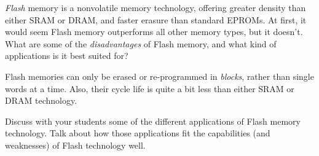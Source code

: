 

{\it Flash} memory is a nonvolatile memory technology, offering greater density than either SRAM or DRAM, and faster erasure than standard EPROMs.  At first, it would seem Flash memory outperforms all other memory types, but it doesn't.  What are some of the {\it disadvantages} of Flash memory, and what kind of applications is it best suited for?







Flash memories can only be erased or re-programmed in {\it blocks}, rather than single words at a time.  Also, their cycle life is quite a bit less than either SRAM or DRAM technology.







Discuss with your students some of the different applications of Flash memory technology.  Talk about how those applications fit the capabilities (and weaknesses) of Flash technology well.




